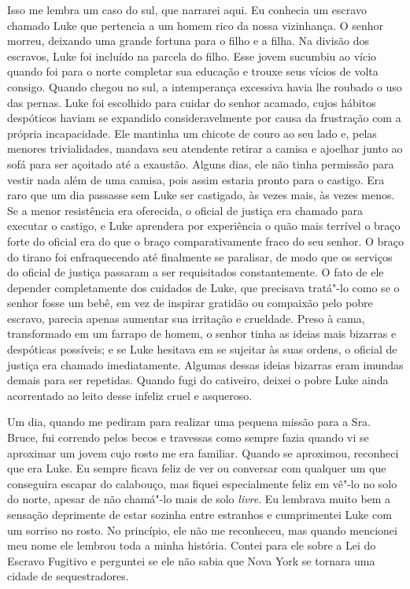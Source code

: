 Isso me lembra um caso do sul, que
narrarei aqui. Eu conhecia um escravo chamado Luke que pertencia a um
homem rico da nossa vizinhança. O senhor morreu, deixando uma grande
fortuna para o filho e a filha. Na divisão dos escravos, Luke foi
incluído na parcela do filho. Esse jovem sucumbiu ao vício quando foi
para o norte completar sua educação e trouxe seus vícios de volta
consigo. Quando chegou no sul, a intemperança excessiva havia lhe
roubado o uso das pernas. Luke foi escolhido para cuidar do senhor
acamado, cujos hábitos despóticos haviam se expandido consideravelmente
por causa da frustração com a própria incapacidade. Ele mantinha um
chicote de couro ao seu lado e, pelas menores trivialidades, mandava seu
atendente retirar a camisa e ajoelhar junto ao sofá para ser açoitado
até a exaustão. Alguns dias, ele não tinha permissão para vestir nada
além de uma camisa, pois assim estaria pronto para o castigo. Era raro
que um dia passasse sem Luke ser castigado, às vezes mais, às vezes
menos. Se a menor resistência era oferecida, o oficial de justiça era
chamado para executar o castigo, e Luke aprendera por experiência o quão
mais terrível o braço forte do oficial era do que o braço
comparativamente fraco do seu senhor. O braço do tirano foi
enfraquecendo até finalmente se paralisar, de modo que os serviços do
oficial de justiça passaram a ser requisitados constantemente. O fato de
ele depender completamente dos cuidados de Luke, que precisava tratá"-lo
como se o senhor fosse um bebê, em vez de inspirar gratidão ou compaixão
pelo pobre escravo, parecia apenas aumentar sua irritação e crueldade.
Preso à cama, transformado em um farrapo de homem, o senhor tinha as
ideias mais bizarras e despóticas possíveis; e se Luke hesitava em se
sujeitar às suas ordens, o oficial de justiça era chamado imediatamente.
Algumas dessas ideias bizarras eram imundas demais para ser repetidas.
Quando fugi do cativeiro, deixei o pobre Luke ainda acorrentado ao leito
desse infeliz cruel e asqueroso.

Um dia, quando me pediram para realizar
uma pequena missão para a Sra. Bruce, fui correndo pelos becos e
travessas como sempre fazia quando vi se aproximar um jovem cujo rosto
me era familiar. Quando se aproximou, reconheci que era Luke. Eu sempre
ficava feliz de ver ou conversar com qualquer um que conseguira escapar
do calabouço, mas fiquei especialmente feliz em vê"-lo no solo do norte,
apesar de não chamá"-lo mais de solo \emph{livre}. Eu lembrava muito bem
a sensação deprimente de estar sozinha entre estranhos e cumprimentei
Luke com um sorriso no rosto. No princípio, ele não me reconheceu, mas
quando mencionei meu nome ele lembrou toda a minha história. Contei para
ele sobre a Lei do Escravo Fugitivo e perguntei se ele não sabia que
Nova York se tornara uma cidade de sequestradores.

